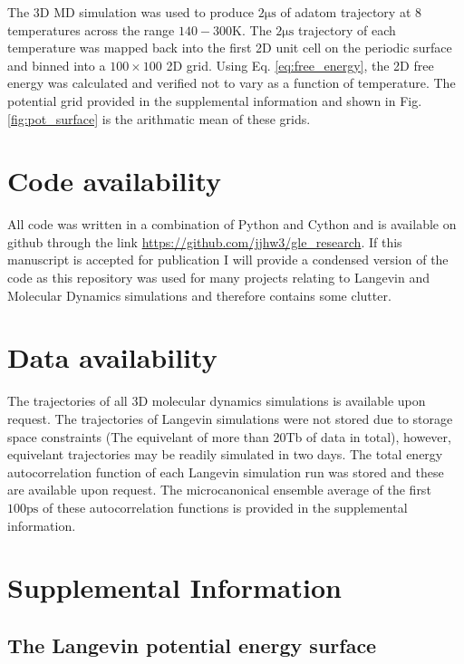 \documentclass[7pt]{article}
\newcommand{\ps}{\si{\pico\second}}
\newcommand{\us}{\si{\micro\second}}
\newcommand{\K}{\si{\kelvin}}
\begin{document}
The 3D MD simulation was used to produce $2\us$ of adatom trajectory at 8 temperatures across the range $140-300\K$. The $2\us$ trajectory of each temperature was mapped back into the first 2D unit cell on the periodic surface and binned into a $100\times100$ 2D grid. Using Eq. \ref{eq:free_energy}, the 2D free energy was calculated and verified not to vary as a function of temperature. The potential grid provided in the supplemental information and shown in Fig. \ref{fig:pot_surface} is the arithmatic mean of these grids.

\section*{Code availability}

All code was written in a combination of Python and Cython and is available on github through the link \url{https://github.com/jjhw3/gle_research}. If this manuscript is accepted for publication I will provide a condensed version of the code as this repository was used for many projects relating to Langevin and Molecular Dynamics simulations and therefore contains some clutter. 

\section*{Data availability}

The trajectories of all 3D molecular dynamics simulations is available upon request. The trajectories of Langevin simulations were not stored due to storage space constraints (The equivelant of more than 20Tb of data in total), however, equivelant trajectories may be readily simulated in two days. The total energy autocorrelation function of each Langevin simulation run was stored and these are available upon request. The microcanonical ensemble average of the first $100\ps$ of these autocorrelation functions is provided in the supplemental information.



\pagebreak
\onecolumn

\section*{Supplemental Information}

\subsection*{The Langevin potential energy surface}
\end{document}
